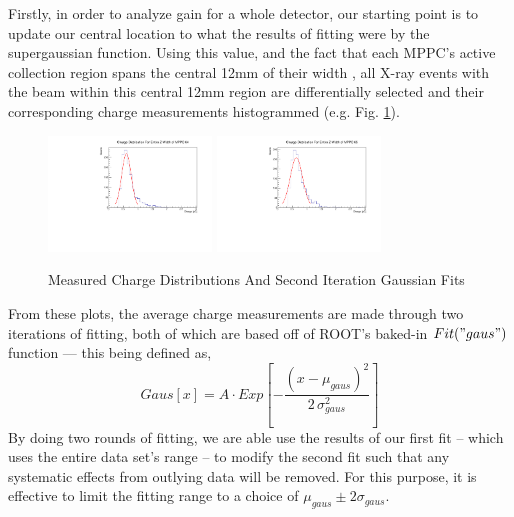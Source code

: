 Firstly, in order to analyze gain for a whole detector, our starting point is to update our central location to what the results of fitting were by the supergaussian function. Using this value, and the fact that each MPPC's active collection region spans the central 12mm of their width \cite{megdesign}, all X-ray events with the beam within this central 12mm region are differentially selected and their corresponding charge measurements histogrammed (e.g. Fig. \ref{fig:qgainfits}). 
\begin{figure}[H]
    \centering
    \includegraphics[width=4.35cm]{graphics/qgaindist64.pdf}
    \includegraphics[width=4.35cm]{graphics/qgaindist65.pdf}
    \caption{Measured Charge Distributions And Second Iteration Gaussian Fits}
    \label{fig:qgainfits}
\end{figure}

From these plots, the average charge measurements are made through two iterations of fitting, both of which are based off of ROOT's baked-in $Fit("gaus")$ function --- this being defined as,
\begin{equation}
    Gaus[x] = A \cdot Exp\left [ - \frac{(x-\mu_{gaus})^{2}}{2\, \sigma_{gaus}^{2}} \right ]
\end{equation}
By doing two rounds of fitting, we are able use the results of our first fit -- which uses the entire data set's range -- to modify the second fit such that any systematic effects from outlying data will be removed. For this purpose, it is effective to limit the fitting range to a choice of $\mu_{gaus}\pm 2 \sigma_{gaus}$.


